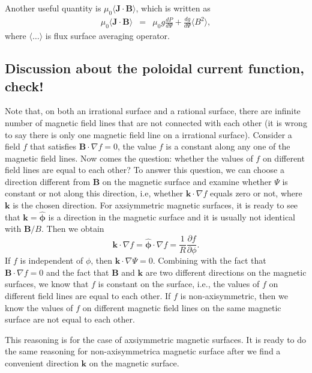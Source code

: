 \documentclass{article}
\newcommand{\tmmathbf}[1]{\ensuremath{\boldsymbol{#1}}}
\begin{document}
Another useful quantity is $\mu_0 \langle \mathbf{J} \cdot \mathbf{B}
\rangle$, which is written as
\begin{eqnarray}
  \mu_0 \langle \mathbf{J} \cdot \mathbf{B} \rangle & = & \mu_0 g \frac{d P}{d
  \Psi} + \frac{d g}{d \Psi} \langle B^2 \rangle, 
\end{eqnarray}
where $\langle \ldots \rangle$ is flux surface averaging operator.

\subsection{\label{11-2-p4}Discussion about the poloidal current function,
check!}

Note that, on both an irrational surface and a rational surface, there are
infinite number of magnetic field lines that are not connected with each other
(it is wrong to say there is only one magnetic field line on a irrational
surface). Consider a field $f$ that satisfies $\mathbf{B} \cdot \nabla f = 0$,
the value $f$ is a constant along any one of the magnetic field lines. Now
comes the question: whether the values of $f$ on different field lines are
equal to each other? To answer this question, we can choose a direction
different from $\mathbf{B}$ on the magnetic surface and examine whether $\Psi$
is constant or not along this direction, i.e, whether $\mathbf{k} \cdot \nabla
f$ equals zero or not, where $\mathbf{k}$ is the chosen direction. For
axsiymmetric magnetic surfaces, it is ready to see that $\mathbf{k}=
\hat{\tmmathbf{\phi}}$ is a direction in the magnetic surface and it is
usually not identical with $\mathbf{B}/ B$. Then we obtain
\begin{equation}
  \mathbf{k} \cdot \nabla f = \hat{\tmmathbf{\phi}} \cdot \nabla f =
  \frac{1}{R}  \frac{\partial f}{\partial \phi} .
\end{equation}
If $f$ is independent of $\phi$, then $\mathbf{k} \cdot \nabla \Psi = 0$.
Combining with the fact that $\mathbf{B} \cdot \nabla f = 0$ and the fact that
$\mathbf{B}$ and $\mathbf{k}$ are two different directions on the magnetic
surfaces, we know that $f$ is constant on the surface, i.e., the values of $f$
on different field lines are equal to each other. If $f$ is non-axisymmetric,
then we know the values of $f$ on different magnetic field lines on the same
magnetic surface are not equal to each other.

This reasoning is for the case of axsiymmetric magnetic surfaces. It is ready
to do the same reasoning for non-axisymmetrica magnetic surface after we find
a convenient direction $\mathbf{k}$ on the magnetic surface.
\end{document}
